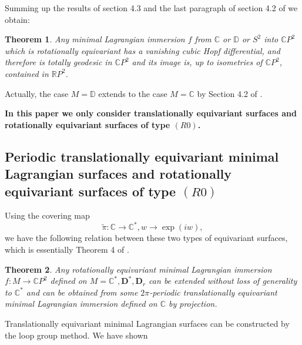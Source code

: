 \documentclass[a4paper,11pt]{amsart}
\newtheorem{theorem}{Theorem}[section]
\theoremstyle{definition}
\numberwithin{equation}{section}
\newcommand{\R}{\mathbb{R}}
\newcommand{\C}{\mathbb{C}}
\newcommand{\D}{\mathbb{D}}
\begin{document}
Summing up the results of section 4.3  and the last paragraph of section 4.2 of \cite{DoMaEX} we obtain: 
\begin{theorem}
Any  minimal Lagrangian immersion $f$ from $\C$ or $\D$ or $S^2$ into $\C P^2$ which is rotationally equivariant has a vanishing cubic Hopf differential, and therefore  is  totally  geodesic in $\C P^2$ and  its image is, up to isometries of $\C P^2$, contained in  $\R P^2$.
\end{theorem}

Actually, the case $M = \D$ extends to the case $M = \C$ by Section 4.2 of \cite{DoMaEX}.

{\bf In this paper we only consider translationally equivariant surfaces and rotationally equivariant surfaces
of type $(R0)$.}
\vspace{2mm}

\subsection{Periodic translationally equivariant minimal Lagrangian surfaces and rotationally equivariant surfaces of type $(R0)$}

Using the covering map
$$ \tilde{\pi}: \C \rightarrow \C^*, w \rightarrow \exp(iw),$$ 
we have the following relation between these two types of equivariant surfaces, which is essentially Theorem 4 of \cite{DoMaEX}.

\begin{theorem}
Any rotationally equivariant minimal Lagrangian immersion $f:M \rightarrow \C P^2$ defined 
on $M =\C^*, \mathbf{D}^*, \mathbf{D}_r$
can be extended without loss of generality to $\C^*$ and can be obtained from some 
$ 2 \pi$-periodic translationally equivariant minimal Lagrangian immersion defined on $\C$ by projection.
\end{theorem}


Translationally equivariant minimal Lagrangian surfaces can be constructed by the loop group method. We have shown
\end{document}
